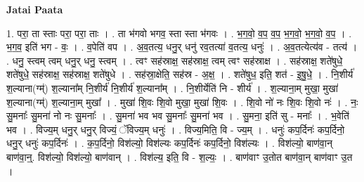 \documentclass[17pt]{extarticle}
\begin{document}
\textbf{Jatai Paata} \newline

1. परा॒ ता स्ताः परा॒ परा॒ ताः । . ता भ॑गवो भगव॒ स्ता स्ता भ॑गवः । . भ॒ग॒वो॒ व॒प॒ व॒प॒ भ॒ग॒वो॒ भ॒ग॒वो॒ व॒प॒ । . भ॒ग॒व॒ इति॑ भग - वः॒ । . व॒पेति॑ वप । . अ॒व॒तत्य॒ धनु॒र् धनु॑ रव॒तत्या॑ व॒तत्य॒ धनुः॑ । . अ॒व॒तत्येत्य॑व - तत्य॑ । . धनु॒ स्त्वम् त्वम् धनु॒र् धनु॒ स्त्वम् । . त्वꣳ सह॑स्राक्ष॒ सह॑स्राक्ष॒ त्वम् त्वꣳ सह॑स्राक्ष । . सह॑स्राक्ष॒ शते॑षुधे॒ शते॑षुधे॒ सह॑स्राक्ष॒ सह॑स्राक्ष॒ शते॑षुधे । . सह॑स्रा॒क्षेति॒ सह॑स्र - अ॒क्ष॒ । . शते॑षुध॒ इति॒ शत॑ - इ॒षु॒धे॒ । . नि॒शीर्य॑ श॒ल्याना(ग्म्॑) श॒ल्याना᳚म् नि॒शीर्य॑ नि॒शीर्य॑ श॒ल्याना᳚म् । . नि॒शीर्येति॑ नि - शीर्य॑ । . श॒ल्याना॒म् मुखा॒ मुखा॑ श॒ल्याना(ग्म्॑) श॒ल्याना॒म् मुखा᳚ । . मुखा॑ शि॒वः शि॒वो मुखा॒ मुखा॑ शि॒वः । . शि॒वो नो॑ नः शि॒वः शि॒वो नः॑ । . नः॒ सु॒मनाः᳚ सु॒मना॑ नो नः सु॒मनाः᳚ । . सु॒मना॑ भव भव सु॒मनाः᳚ सु॒मना॑ भव । . सु॒मना॒ इति॑ सु - मनाः᳚ । . भ॒वेति॑ भव । . विज्य॒म् धनु॒र् धनु॒र् विज्यं॒ ॅविज्य॒म् धनुः॑ । . विज्य॒मिति॒ वि - ज्य॒म् । . धनुः॑ कप॒र्दिनः॑ कप॒र्दिनो॒ धनु॒र् धनुः॑ कप॒र्दिनः॑ । . क॒प॒र्दिनो॒ विश॑ल्यो॒ विश॑ल्यः कप॒र्दिनः॑ कप॒र्दिनो॒ विश॑ल्यः । . विश॑ल्यो॒ बाण॑वा॒न् बाण॑वा॒न्॒. विश॑ल्यो॒ विश॑ल्यो॒ बाण॑वान् । . विश॑ल्य॒ इति॒ वि - श॒ल्यः॒ । . बाण॑वाꣳ उ॒तोत बाण॑वा॒न् बाण॑वाꣳ उ॒त । \newline
\end{document}
